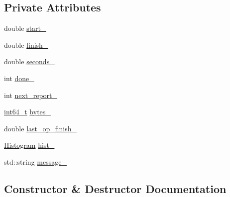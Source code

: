 \subsection*{Private Attributes}
\begin{DoxyCompactItemize}
\item 
double \hyperlink{classleveldb_1_1anonymous__namespace_02db__bench_8cc_03_1_1_stats_ab917bded97f65cd70987a93308aad419}{start\+\_\+}
\item 
double \hyperlink{classleveldb_1_1anonymous__namespace_02db__bench_8cc_03_1_1_stats_abba31c0cee55cac76dd115a68dc9c212}{finish\+\_\+}
\item 
double \hyperlink{classleveldb_1_1anonymous__namespace_02db__bench_8cc_03_1_1_stats_a04e24c3d4e71615bcd50843db027e174}{seconds\+\_\+}
\item 
int \hyperlink{classleveldb_1_1anonymous__namespace_02db__bench_8cc_03_1_1_stats_ae255b1fad7367533e27728a5fd938bc3}{done\+\_\+}
\item 
int \hyperlink{classleveldb_1_1anonymous__namespace_02db__bench_8cc_03_1_1_stats_a994cced0fcac1ec8e9973fd3cc055ade}{next\+\_\+report\+\_\+}
\item 
\hyperlink{stdint_8h_adec1df1b8b51cb32b77e5b86fff46471}{int64\+\_\+t} \hyperlink{classleveldb_1_1anonymous__namespace_02db__bench_8cc_03_1_1_stats_a6592f3c9da4384d8b0df1136c49b8315}{bytes\+\_\+}
\item 
double \hyperlink{classleveldb_1_1anonymous__namespace_02db__bench_8cc_03_1_1_stats_af400563ad546a5d7c6210b2a822be55d}{last\+\_\+op\+\_\+finish\+\_\+}
\item 
\hyperlink{classleveldb_1_1_histogram}{Histogram} \hyperlink{classleveldb_1_1anonymous__namespace_02db__bench_8cc_03_1_1_stats_a6c1dd789977dc7d55b63b2e9b4f9a499}{hist\+\_\+}
\item 
std\+::string \hyperlink{classleveldb_1_1anonymous__namespace_02db__bench_8cc_03_1_1_stats_a20a87ebb0459044716aa623ecd7a25e3}{message\+\_\+}
\end{DoxyCompactItemize}


\subsection{Constructor \& Destructor Documentation}
\hypertarget{classleveldb_1_1anonymous__namespace_02db__bench_8cc_03_1_1_stats_a97e33b0731a00dac19e12406bd40729b}{}
